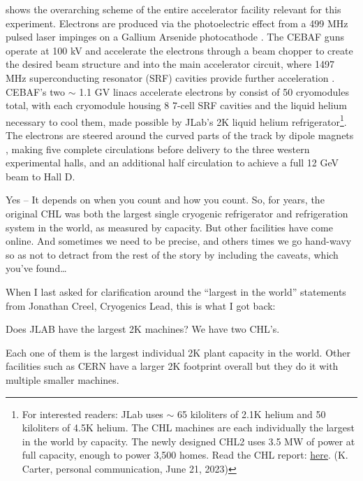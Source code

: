      shows the overarching scheme of the entire accelerator facility relevant for this experiment. Electrons are produced via the photoelectric effect from a 499 MHz pulsed laser impinges on a Gallium Arsenide photocathode . The CEBAF guns operate at 100 kV and accelerate the electrons through a beam chopper  to create the desired beam structure  and into the main accelerator circuit, where 1497 MHz superconducting resonator (SRF) cavities provide further acceleration . CEBAF's two $\sim$ 1.1 GV linacs accelerate electrons by consist of 50 cryomodules total, with each cryomodule housing 8 7-cell SRF cavities and the liquid helium necessary to cool them, made possible by JLab's 2K liquid helium refrigerator\footnote{For interested readers: JLab uses $\sim$ 65 kiloliters of 2.1K helium and 50 kiloliters of 4.5K helium. The CHL machines are each individually the largest in the world by capacity. The newly designed CHL2 uses 3.5 MW of power at full capacity, enough to power 3,500 homes. Read the CHL report: \href{https://misportal.jlab.org/ul/publications/view_pub.cfm?pub_id=13998}{here}. (K. Carter, personal communication, June 21, 2023) }. The electrons are steered around the curved parts of the track by dipole magnets , making five complete circulations before delivery to the three western experimental halls, and an additional half circulation to achieve a full 12 GeV beam to Hall D. 

    \iffalse  
    Yes – It depends on when you count and how you count. So, for years, the original CHL was both the largest single cryogenic refrigerator and refrigeration system in the world, as measured by capacity. But other facilities have come online. And sometimes we need to be precise, and others times we go hand-wavy so as not to detract from the rest of the story by including the caveats, which you’ve found…
     
    When I last asked for clarification around the “largest in the world” statements from Jonathan Creel, Cryogenics Lead, this is what I got back:
    
    Does JLAB have the largest 2K machines? We have two CHL’s.
    
    Each one of them is the largest individual 2K plant capacity in the world. Other facilities such as CERN have a larger 2K footprint overall but they do it with multiple smaller machines.
        
